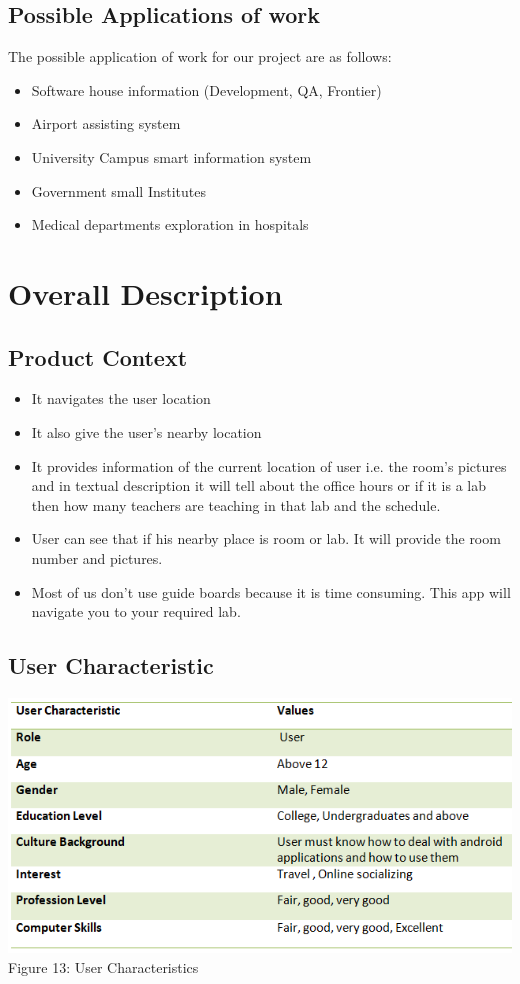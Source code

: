 \documentclass{article}
\begin{document}
\subsection{Possible Applications of work}
The possible application of work for our project are as follows:


\begin{itemize}
\item Software house information (Development, QA, Frontier)
\item Airport assisting system
\item University Campus smart information system
\item Government small Institutes
\item Medical departments exploration in hospitals
\end{itemize}

\section{Overall Description}
\subsection{Product Context}
\begin{itemize}
\item It navigates the user location
\item It also give the user’s nearby location
\item It provides information of the current location of user i.e. the room’s pictures and in textual description it will tell about the office hours or if it is a lab then how many teachers are teaching in that lab and the schedule.
\item User can see that if his nearby place is room or lab. It will provide the room number and pictures.
\item Most of us don’t use guide boards because it is time consuming. This app will navigate you to your required lab.

\end{itemize}
\subsection{User Characteristic}
\begin{center}
\includegraphics[scale=0.8]{userch}
\\Figure 13: User Characteristics
\end{center}
\end{document}
